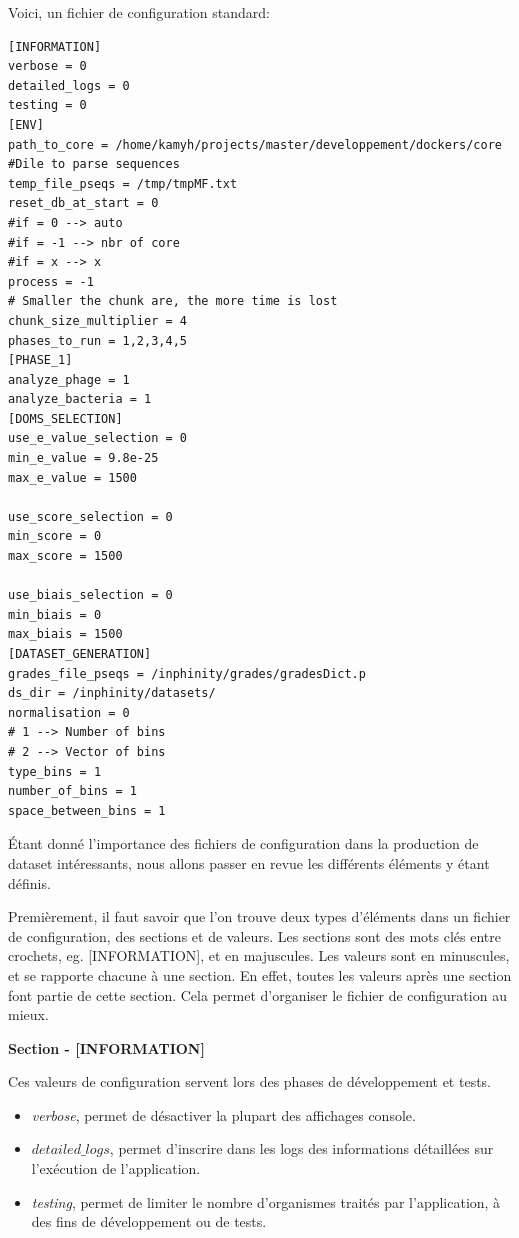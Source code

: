 Voici, un fichier de configuration standard:

\begin{lstlisting}[frame=single]
[INFORMATION]
verbose = 0
detailed_logs = 0
testing = 0
[ENV]
path_to_core = /home/kamyh/projects/master/developpement/dockers/core
#Dile to parse sequences
temp_file_pseqs = /tmp/tmpMF.txt
reset_db_at_start = 0
#if = 0 --> auto
#if = -1 --> nbr of core
#if = x --> x
process = -1
# Smaller the chunk are, the more time is lost
chunk_size_multiplier = 4
phases_to_run = 1,2,3,4,5
[PHASE_1]
analyze_phage = 1
analyze_bacteria = 1
[DOMS_SELECTION]
use_e_value_selection = 0
min_e_value = 9.8e-25
max_e_value = 1500

use_score_selection = 0
min_score = 0
max_score = 1500

use_biais_selection = 0
min_biais = 0
max_biais = 1500
[DATASET_GENERATION]
grades_file_pseqs = /inphinity/grades/gradesDict.p
ds_dir = /inphinity/datasets/
normalisation = 0
# 1 --> Number of bins
# 2 --> Vector of bins
type_bins = 1
number_of_bins = 1
space_between_bins = 1
\end{lstlisting}

Étant donné l'importance des fichiers de configuration dans la production de dataset intéressants, nous allons passer en revue les différents éléments y étant définis.

Premièrement, il faut savoir que l'on trouve deux types d'éléments dans un fichier de configuration, des sections et de valeurs. Les sections sont des mots clés entre crochets, eg. [INFORMATION], et en majuscules. Les valeurs sont en minuscules, et se rapporte chacune à une section. En effet, toutes les valeurs après une section font partie de cette section. Cela permet d'organiser le fichier de configuration au mieux.

\textbf{Section - [INFORMATION]}

Ces valeurs de configuration servent lors des phases de développement et tests.

\begin{itemize}
\item \emph{verbose}, permet de désactiver la plupart des affichages console.
\item \emph{$detailed\_logs$}, permet d'inscrire dans les logs des informations détaillées sur l'exécution de l'application.
\item \emph{testing}, permet de limiter le nombre d'organismes traités par l'application, à des fins de développement ou de tests. 
\end{itemize}

